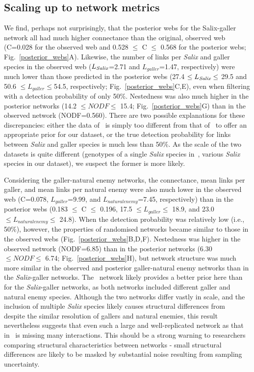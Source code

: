 \documentclass[12pt]{article}
\begin{document}
    \subsection*{Scaling up to network metrics}


      We find, perhaps not surprisingly, that the posterior webs for the Salix-galler network all had much higher connectance than the original, observed web (C=0.028 for the observed web and 0.528 $\leq$ C $\leq$ 0.568 for the posterior webs; Fig.~\ref{posterior_webs}A). Likewise, the number of links per \emph{Salix} and galler species in the observed web ($L_{\emph{Salix}}$=2.71 and $L_{galler}$=1.47, respectively) were much lower than those predicted in the posterior webs (27.4 $\leq L_{\emph{Salix}} \leq$ 29.5 and 50.6 $\leq L_{galler} \leq $54.5, respectively; Fig.~\ref{posterior_webs}C,E), even when filtering with a detection probability of only 50\%. Nestedness was also much higher in the posterior networks (14.2 $\leq NODF \leq$ 15.4; Fig.~\ref{posterior_webs}G) than in the observed network (NODF=0.560). There are two possible explanations for these discrepancies: either the data of~\citet{Barbour2016} is simply too different from that of~\citet{Kopelke2017} to offer an appropriate prior for our dataset, or the true detection probability for links between \emph{Salix} and galler species is much less than 50\%. As the scale of the two datasets is quite different (genotypes of a single \emph{Salix} species in~\citet{Barbour2016}, various \emph{Salix} species in our dataset), we suspect the former is more likely.


      Considering the galler-natural enemy networks, the connectance, mean links per galler, and mean links per natural enemy were also much lower in the observed web (C=0.078, $L_{galler}$=9.99, and $L_{natural enemy}$=7.45, respectively) than in the posterior webs (0.183 $\leq$ C $\leq$ 0.196, 17.5 $\leq L_{galler} \leq$ 18.9, and 23.0 $\leq L_{natural enemy} \leq$ 24.8). When the detection probability was relatively low (i.e., 50\%), however, the properties of randomised networks became similar to those in the observed webs (Fig.~\ref{posterior_webs}B,D,F). Nestedness was higher in the observed network (NODF=6.85) than in the posterior networks (6.30 $\leq NODF \leq$ 6.74; Fig.~\ref{posterior_webs}H), but network structure was much more similar in the observed and posterior galler-natural enemy networks than in the \emph{Salix}-galler networks. The~\citet{Barbour2016} network likely provides a better prior here than for the \emph{Salix}-galler networks, as both networks included different galler and natural enemy species. Although the two networks differ vastly in scale, and the inclusion of multiple \emph{Salix} species likely causes structural differences from~\citet{Barbour2016} despite the similar resolution of gallers and natural enemies, this result nevertheless suggests that even such a large and well-replicated network as that in~\citet{Kopelke2017} is missing many interactions. This should be a strong warning to researchers comparing structural characteristics between networks - small structural differences are likely to be masked by substantial noise resulting from sampling uncertainty.
\end{document}
